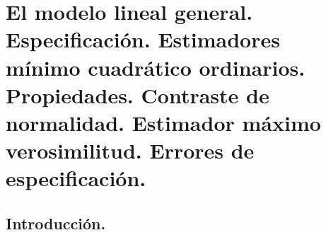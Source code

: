 
\chapter{El modelo lineal general. Especificaci\'on. Estimadores m\'inimo cuadr\'atico
ordinarios. Propiedades. Contraste de normalidad. Estimador m\'aximo
verosimilitud. Errores de especificaci\'on.}


\section{Introducci\'on.}



